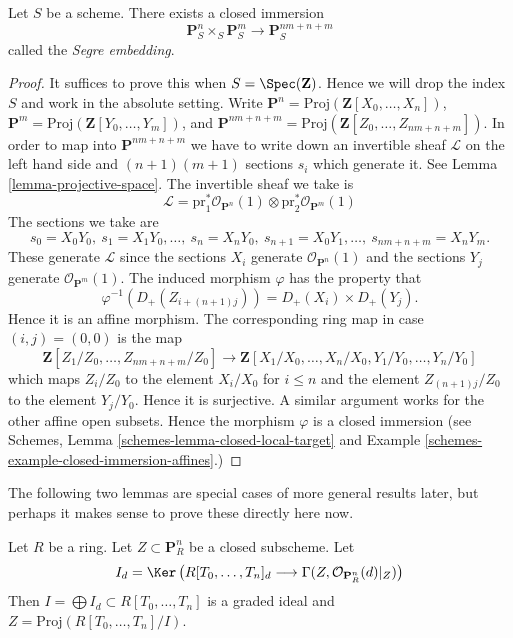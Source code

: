 \begin{lemma}
\label{lemma-segre-embedding}
Let $S$ be a scheme. There exists a closed immersion
$$
\mathbf{P}^n_S \times_S \mathbf{P}^m_S
\longrightarrow
\mathbf{P}^{nm + n + m}_S
$$
called the {\it Segre embedding}.
\end{lemma}

\begin{proof}
It suffices to prove this when $S = \Spec(\mathbf{Z})$.
Hence we will drop the index $S$ and work in the absolute setting.
Write $\mathbf{P}^n = \text{Proj}(\mathbf{Z}[X_0, \ldots, X_n])$,
$\mathbf{P}^m = \text{Proj}(\mathbf{Z}[Y_0, \ldots, Y_m])$,
and
$\mathbf{P}^{nm + n + m} =
\text{Proj}(\mathbf{Z}[Z_0, \ldots, Z_{nm + n + m}])$.
In order to map into $\mathbf{P}^{nm + n + m}$ we have to
write down an invertible sheaf $\mathcal{L}$ on the left hand
side and $(n + 1)(m + 1)$ sections $s_i$ which generate it.
See Lemma \ref{lemma-projective-space}.
The invertible sheaf we take is
$$
\mathcal{L} =
\text{pr}_1^*\mathcal{O}_{\mathbf{P}^n}(1)
\otimes
\text{pr}_2^*\mathcal{O}_{\mathbf{P}^m}(1)
$$
The sections we take are
$$
s_0 = X_0Y_0, \ s_1 = X_1Y_0, \ldots, \ s_n = X_nY_0,
\ s_{n + 1} = X_0Y_1, \ldots, \ s_{nm + n + m} = X_nY_m.
$$
These generate $\mathcal{L}$ since the sections $X_i$ generate
$\mathcal{O}_{\mathbf{P}^n}(1)$ and the sections $Y_j$ generate
$\mathcal{O}_{\mathbf{P}^m}(1)$. The induced morphism
$\varphi$ has the property that
$$
\varphi^{-1}(D_{+}(Z_{i + (n + 1)j})) = D_{+}(X_i) \times D_{+}(Y_j).
$$
Hence it is an affine morphism. The corresponding ring map in case
$(i, j) = (0, 0)$ is the map
$$
\mathbf{Z}[Z_1/Z_0, \ldots, Z_{nm + n + m}/Z_0]
\longrightarrow
\mathbf{Z}[X_1/X_0, \ldots, X_n/X_0, Y_1/Y_0, \ldots, Y_n/Y_0]
$$
which maps $Z_i/Z_0$ to the element $X_i/X_0$ for $i \leq n$ and
the element $Z_{(n + 1)j}/Z_0$ to the element $Y_j/Y_0$. Hence it
is surjective. A similar argument works for the other affine
open subsets. Hence the morphism $\varphi$ is a closed immersion
(see Schemes, Lemma \ref{schemes-lemma-closed-local-target} and
Example \ref{schemes-example-closed-immersion-affines}.)
\end{proof}

\noindent
The following two lemmas are special cases of more general results later, but
perhaps it makes sense to prove these directly here now.

\begin{lemma}
\label{lemma-closed-in-projective-space}
Let $R$ be a ring. Let $Z \subset \mathbf{P}^n_R$ be a closed subscheme.
Let
$$
I_d = \Ker\left(
R[T_0, \ldots, T_n]_d
\longrightarrow
\Gamma(Z, \mathcal{O}_{\mathbf{P}^n_R}(d)|_Z)\right)
$$
Then $I = \bigoplus I_d \subset R[T_0, \ldots, T_n]$ is
a graded ideal and $Z = \text{Proj}(R[T_0, \ldots, T_n]/I)$.
\end{lemma}

